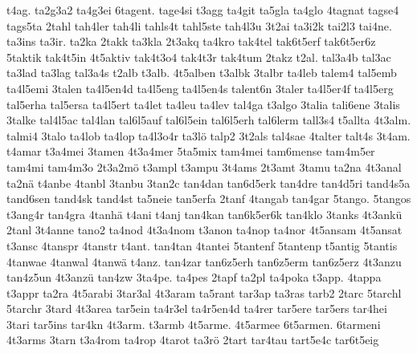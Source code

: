 {    t4ag.
    ta2g3a2
    ta4g3ei
    6tagent.
    tage4si
    t3agg
    ta4git
    ta5gla
    ta4glo
    4tagnat
    tagse4
    tags5ta
    2tahl
    tah4ler
    tah4li
    tahls4t
    tahl5ste
    tah4l3u
    3t2ai
    ta3i2k
    tai2l3
    tai4ne.
    ta3ins
    ta3ir.
    ta2ka
    2takk
    ta3kla
    2t3akq
    ta4kro
    tak4tel
    tak6t5erf
    tak6t5er6z
    5taktik
    tak4t5in
    4t5aktiv
    tak4t3o4
    tak4t3r
    tak4tum
    2takz
    t2al.
    tal3a4b
    tal3ac
    ta3lad
    ta3lag
    tal3a4s
    t2alb
    t3alb.
    4t5alben
    t3albk
    3talbr
    ta4leb
    talem4
    tal5emb
    ta4l5emi
    3talen
    ta4l5en4d
    ta4l5eng
    ta4l5en4s
    talent6n
    3taler
    ta4l5er4f
    ta4l5erg
    tal5erha
    tal5ersa
    ta4l5ert
    ta4let
    ta4leu
    ta4lev
    tal4ga
    t3algo
    3talia
    tali6ene
    3talis
    3talke
    tal4l5ac
    tal4lan
    tal6l5auf
    tal6l5ein
    tal6l5erh
    tal6lerm
    tall3s4
    t5allta
    4t3alm.
    talmi4
    3talo
    ta4lob
    ta4lop
    ta4l3o4r
    ta3lö
    talp2
    3t2als
    tal4sae
    4talter
    talt4s
    3t4am.
    t4amar
    t3a4mei
    3tamen
    4t3a4mer
    5ta5mix
    tam4mei
    tam6mense
    tam4m5er
    tam4mi
    tam4m3o
    2t3a2mö
    t3ampl
    t3ampu
    3t4ams
    2t3amt
    3tamu
    ta2na
    4t3anal
    ta2nä
    t4anbe
    4tanbl
    3tanbu
    3tan2c
    tan4dan
    tan6d5erk
    tan4dre
    tan4d5ri
    tand4s5a
    tand6sen
    tand4sk
    tand4st
    ta5neie
    tan5erfa
    2tanf
    4tangab
    tan4gar
    5tango.
    5tangos
    t3ang4r
    tan4gra
    4tanhä
    t4ani
    t4anj
    tan4kan
    tan6k5er6k
    tan4klo
    3tanks
    4t3ankü
    2tanl
    3t4anne
    tano2
    ta4nod
    4t3a4nom
    t3anon
    ta4nop
    ta4nor
    4t5ansam
    4t5ansat
    t3ansc
    4tanspr
    4tanstr
    t4ant.
    tan4tan
    4tantei
    5tantenf
    5tantenp
    t5antig
    5tantis
    4tanwae
    4tanwal
    4tanwä
    t4anz.
    tan4zar
    tan6z5erh
    tan6z5erm
    tan6z5erz
    4t3anzu
    tan4z5un
    4t3anzü
    tan4zw
    3ta4pe.
    ta4pes
    2tapf
    ta2pl
    ta4poka
    t3app.
    4tappa
    t3appr
    ta2ra
    4t5arabi
    3tar3al
    4t3aram
    ta5rant
    tar3ap
    ta3ras
    tarb2
    2tarc
    5tarchl
    5tarchr
    3tard
    4t3area
    tar5ein
    ta4r3el
    ta4r5en4d
    ta4rer
    tar5ere
    tar5ers
    tar4hei
    3tari
    tar5ins
    tar4kn
    4t3arm.
    t3armb
    4t5arme.
    4t5armee
    6t5armen.
    6tarmeni
    4t3arms
    3tarn
    t3a4rom
    ta4rop
    4tarot
    ta3rö
    2tart
    tar4tau
    tart5e4c
    tar6t5eig
}
